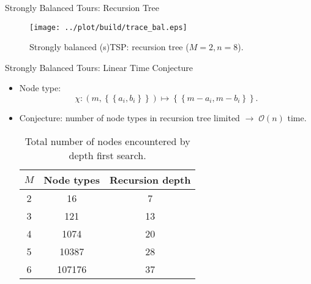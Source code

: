 \documentclass[
  size=8pt,
  style=klope,
  paper=screen,
  mode=present,
  nohandoutpagebreaks,
  pauseslide,
  hlsections,
  fleqn,
]{powerdot}
\def\board{{\color{green} [Optional: board.]}}
\def\eqitspace{\vspace{-5mm}}
\begin{document}
\begin{slide}[toc=]{Strongly Balanced Tours: Recursion Tree}
  \begin{figure}[H]
    \centering
    \texttt{[image: ../plot/build/trace\_bal.eps]}
    \caption{Strongly balanced (s)TSP: recursion tree ($M=2,n=8$).}
  \end{figure}
\end{slide}

\begin{slide}[toc=]{Strongly Balanced Tours: Linear Time Conjecture}
  \begin{itemize}
  \item
    Node type:
    \begin{equation}
    \chi : \left(m,\left\{\left\{a_i,b_i\right\}\right\}\right)
    \mapsto
     \left\{\left\{m-a_i,m-b_i\right\}\right\}.
   \end{equation}
   \eqitspace%
   \item
   Conjecture: number of node types in recursion tree limited
   $\rightarrow \; \mathcal{O}\left(n\right)$ time.
    \begin{table}[htpb]
    \centering
    \begin{tabular}{cSc}
      \toprule
      {\bfseries $M$ } &
      {\bfseries Node types} &
      {\bfseries Recursion depth } \\
       &     16 &  7 \\
      3 &    121 & 13 \\
      4 &   1074 & 20 \\
      5 &  10387 & 28 \\
      6 & 107176 & 37 \\
      \bottomrule
    \end{tabular}
    \caption{Total number of nodes encountered by depth first search.}
    \end{table}
  \end{itemize}
\end{slide}
\end{document}
